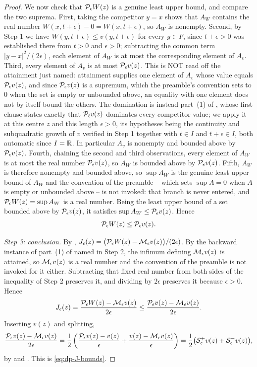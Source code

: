 \begin{proof}
We now check that $\mathcal{P}_\epsilon W(z)$ is a genuine least upper bound, and
compare the two suprema. First, taking the competitor $y=x$ shows that $A_W$
contains the real number $W(x,t+\epsilon)-0=W(x,t+\epsilon)$, so $A_W$ is
nonempty. Second, by Step 1 we have $W(y,t+\epsilon)\le v(y,t+\epsilon)$ for
every $y\in F$, since $t+\epsilon>0$ was established there from $t>0$ and
$\epsilon>0$; subtracting the common term $|y-x|^2/(2\epsilon)$, each element of
$A_W$ is at most the corresponding element of $A_v$. Third, every element of $A_v$ is at
most $\mathcal{P}_\epsilon v(z)$. This is NOT read off the attainment just named:
attainment supplies one element of $A_v$ whose value equals $\mathcal{P}_\epsilon v(z)$,
and since $\mathcal{P}_\epsilon v(z)$ is a supremum, which the preamble's convention sets
to $0$ when the set is empty or unbounded above, an equality with one element does
not by itself bound the others. The domination is instead part~(1) of
, whose first clause states exactly that
$\mathcal{P}_\ell v(z)$ dominates every competitor value; we apply it at this centre $z$
and this length $\epsilon>0$, its hypotheses being the continuity and subquadratic
growth of $v$ verified in Step 1 together with $t\in I$ and $t+\epsilon\in I$, both
automatic since $I=\mathbb{R}$. In particular $A_v$ is nonempty and bounded above by
$\mathcal{P}_\epsilon v(z)$. Fourth,
chaining the second and third observations, every element of $A_W$ is at most
the real number $\mathcal{P}_\epsilon v(z)$, so $A_W$ is bounded above by
$\mathcal{P}_\epsilon v(z)$. Fifth, $A_W$ is therefore nonempty and bounded above, so
$\sup A_W$ is the genuine least upper bound of $A_W$ and the convention of the
preamble -- which sets $\sup A=0$ when $A$ is empty or unbounded above -- is not
invoked: that branch is never entered, and $\mathcal{P}_\epsilon W(z)=\sup A_W$ is a
real number. Being the least upper bound of a set bounded above by
$\mathcal{P}_\epsilon v(z)$, it satisfies $\sup A_W\le\mathcal{P}_\epsilon v(z)$. Hence
\[
  \mathcal{P}_\epsilon W(z)\le\mathcal{P}_\epsilon v(z).
\]

\emph{Step 3: conclusion.}
By ,
$J_\epsilon(z)=\bigl(\mathcal{P}_\epsilon W(z)-\mathcal{M}_\epsilon v(z)\bigr)/(2\epsilon)$.
By the backward instance of part~(1) of  named in
Step 2, the infimum defining $\mathcal{M}_\epsilon v(z)$ is attained, so
$\mathcal{M}_\epsilon v(z)$ is a real number and the convention of the preamble is not
invoked for it either. Subtracting that fixed real number from both sides of the
inequality of Step 2 preserves it, and dividing by $2\epsilon$ preserves it
because $\epsilon>0$. Hence
\[
  J_\epsilon(z)=\frac{\mathcal{P}_\epsilon W(z)-\mathcal{M}_\epsilon v(z)}{2\epsilon}
   \le\frac{\mathcal{P}_\epsilon v(z)-\mathcal{M}_\epsilon v(z)}{2\epsilon}.
\]
Inserting $v(z)$ and splitting,
\[
  \frac{\mathcal{P}_\epsilon v(z)-\mathcal{M}_\epsilon v(z)}{2\epsilon}
   =\frac12\left(\frac{\mathcal{P}_\epsilon v(z)-v(z)}{\epsilon}
     +\frac{v(z)-\mathcal{M}_\epsilon v(z)}{\epsilon}\right)
   =\frac12\bigl(\mathcal{S}_\epsilon^+v(z)+\mathcal{S}_\epsilon^-v(z)\bigr),
\]
by  and . This is
\eqref{eq:dp-J-bounds}.
\end{proof}
